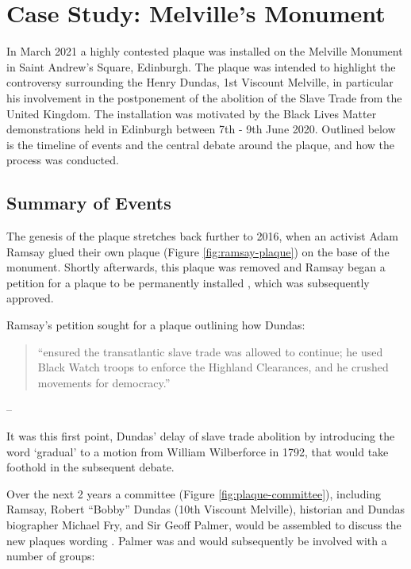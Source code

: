 \documentclass{scrartcl}
\renewcommand{\cite}{\parencite}
\begin{document}
\section{Case Study: Melville's Monument}

In March 2021 a highly contested plaque was installed on the Melville Monument in Saint Andrew's Square, Edinburgh. 
The plaque was intended to highlight the controversy surrounding the Henry Dundas, 1st Viscount Melville, in particular his involvement in the postponement of the abolition of the Slave Trade from the United Kingdom. 
The installation was motivated by the Black Lives Matter demonstrations held in Edinburgh between 7th - 9th June 2020. 
Outlined below is the timeline of events and the central debate around the plaque, and how the process was conducted.

\subsection{Summary of Events}

The genesis of the plaque stretches back further to 2016, when an activist Adam Ramsay glued their own plaque \cite[][]{ramsay_2016} (Figure \ref{fig:ramsay-plaque}) on the base of the monument. Shortly afterwards, this plaque was removed and Ramsay began a petition for a plaque to be permanently installed \cite[][]{council_2016}, which was subsequently approved.

Ramsay's petition sought for a plaque outlining how Dundas:

\begin{quotation}
    ``ensured the transatlantic slave trade was allowed to continue; he used Black Watch troops to enforce the Highland Clearances, and he crushed movements for democracy.''
\end{quotation} 
\begin{flushright}
-- \cite[][]{council_2016}
\end{flushright}

It was this first point, Dundas' delay of slave trade abolition by introducing the word `gradual' to a motion from William Wilberforce in 1792, that would take foothold in the subsequent debate.

Over the next 2 years a committee (Figure \ref{fig:plaque-committee}), including Ramsay, Robert ``Bobby'' Dundas (10th Viscount Melville), historian and Dundas biographer Michael Fry, and Sir Geoff Palmer, would be assembled to discuss the new plaques wording \cite[][]{c4n_2018}. Palmer was and would subsequently be involved with a number of groups:
\end{document}
